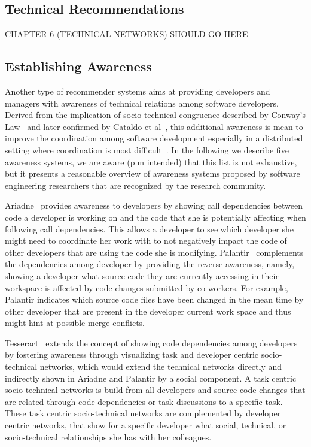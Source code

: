 \subsection{Technical Recommendations}

CHAPTER 6 (TECHNICAL NETWORKS) SHOULD GO HERE

\subsection{Establishing Awareness}
Another type of recommender systems aims at providing developers and managers with awareness of technical relations among software developers.
Derived from the implication of socio-technical congruence described by Conway's Law~\cite{conway:datamination:1968} and later confirmed by Cataldo et al~\cite{cataldo:cscw:2006}, this additional awareness is mean to improve the coordination among software development especially in a distributed setting where coordination is most difficult~\cite{olson:hci:2000}.
In the following we describe five awareness systems, we are aware (pun intended) that this list is not exhaustive, but it presents a reasonable overview of awareness systems proposed by software engineering researchers that are recognized by the research community.

Ariadne~\cite{trainer2005:ariadne} provides awareness to developers by showing call dependencies between code a developer is working on and the code that she is potentially affecting when following call dependencies.
This allows a developer to see which developer she might need to coordinate her work with to not negatively impact the code of other developers that are using the code she is modifying.
%
Palantir~\cite{sarma:cscw:2002} complements the dependencies among developer by providing the reverse awareness, namely, showing a developer what source code they are currently accessing in their workspace is affected by code changes submitted by co-workers.
For example, Palantir indicates which source code files have been changed in the mean time by other developer that are present in the developer current work space and thus might hint at possible merge conflicts.

Tesseract~\cite{arma:icse:2009} extends the concept of showing code dependencies among developers by fostering awareness through visualizing task and developer centric socio-technical networks, which would extend the technical networks directly and indirectly shown in Ariadne and Palantir by a social component.
A task centric socio-technical networks is build from all developers and source code changes that are related through code dependencies or task discussions to a specific task.
These task centric socio-technical networks are complemented by developer centric networks, that show for a specific developer what social, technical, or socio-technical relationships she has with her colleagues.

